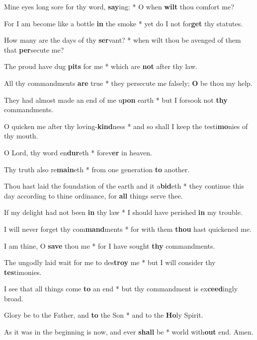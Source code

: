 \begin{multicols}{2}
	Mine eyes long sore for thy word, \textbf{say}ing: * O when \textbf{wilt} thou comfort me?
	
	For I am become like a bottle \textbf{in} the smoke * yet do I not for\textbf{get} thy statutes.
	
	How many are the days of thy \textbf{ser}vant? * when wilt thou be avenged of them that \textbf{per}secute me?
	
	The proud have dug \textbf{pits} for me * which are \textbf{not} after thy law.
	
	All thy commandments \textbf{are} true * they persecute me falsely; \textbf{O} be thou my help.
	
	They had almost made an end of me u\textbf{pon} earth * but I forsook not \textbf{thy} commandments.
	
	O quicken me after thy loving-\textbf{kind}ness * and so shall I keep the testi\textbf{mo}nies of thy mouth.
	
	O Lord, thy word en\textbf{dur}eth * forev\textbf{er} in heaven.
	
	Thy truth also re\textbf{main}eth * from one generation \textbf{to} another.
	
	Thou hast laid the foundation of the earth and it a\textbf{bid}eth * they continue this day according to thine ordinance, for \textbf{all} things serve thee.
	
	If my delight had not been \textbf{in} thy law * I should have perished \textbf{in} my trouble.
	
	I will never forget thy com\textbf{mand}ments * for with them \textbf{thou} hast quickened me.
	
	I am thine, O \textbf{save} thou me * for I have sought \textbf{thy} commandments.
	
	The ungodly laid wait for me to des\textbf{troy} me * but I will consider thy \textbf{tes}timonies.
	
	I see that all things come \textbf{to} an end * but thy commandment is ex\textbf{ceed}ingly broad.
	
	Glory be to the Father, and \textbf{to} the Son * and to the \textbf{Ho}ly Spirit.
	
	As it was in the beginning is now, and ever \textbf{shall} be * world with\textbf{out} end. Amen.
\end{multicols}